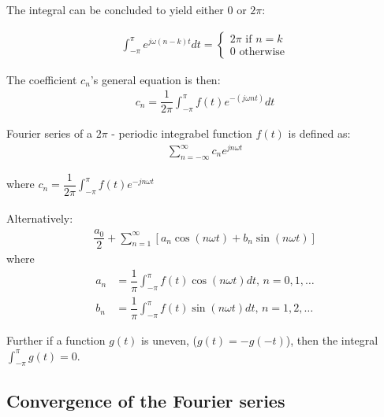 The integral can be concluded to yield either $0$ or $2\pi$:

\begin{align}
	\int_{-\pi}^{\pi} e^{j \omega (n-k)t}dt 
	= 
	\begin{cases}
			2\pi \text{ if } n=k\\
			0 \text{ otherwise}
	\end{cases}
\end{align}

The coefficient $c_n$'s general equation is then:
\begin{align*}
	c_n = \dfrac{1}{2\pi} \int_{-\pi}^{\pi} f(t) e^{-(j \omega nt)}dt
\end{align*} 

\begin{definition}
Fourier series of a $2\pi$ - periodic integrabel function $f(t)$ is defined as:
\begin{align*}
	\sum_{n=-\infty}^\infty c_n e^{j n \omega t}
\end{align*}

where $c_n = \dfrac{1}{2\pi}\int_{- \pi}^\pi f(t) e^{-j n \omega t}$
\\\\
Alternatively:
\begin{align*}
	\dfrac{a_0}{2} + \sum_{n=1}^{\infty} \left[ a_n \cos(n \omega t) + b_n \sin(n \omega t)\right]
\end{align*} 
where
\begin{align*}
	a_n 
	&= \dfrac{1}{\pi} \int_{-\pi}^\pi f(t) \cos (n \omega t) dt, \, n=0,1,\dots\\
	b_n
	&= \dfrac{1}{\pi} \int_{-\pi}^\pi f(t) \sin (n \omega t) dt, \, n=1,2,\dots	
\end{align*}
\end{definition}

Further if a function $g(t)$ is uneven, ($g(t) = -g(-t)$), then the integral $\int_{-\pi}^\pi g(t) = 0$.

\subsection{Convergence of the Fourier series}

